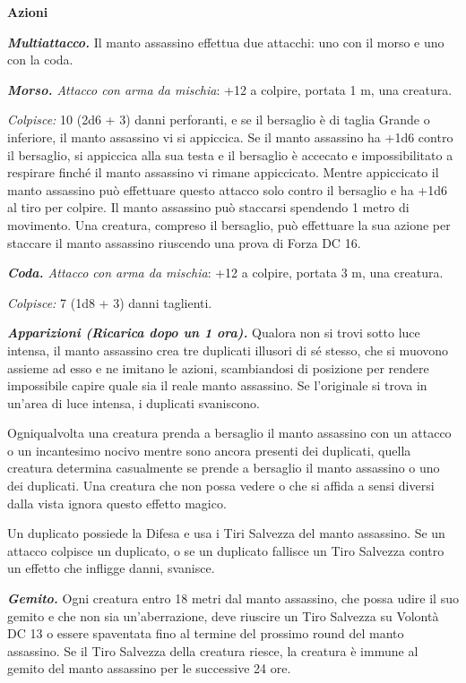 \begin{multicols}{2}
	\textbf{Azioni}

	\textit{\textbf{Multiattacco.}} Il manto assassino effettua due attacchi:
	uno con il morso e uno con la coda.

	\textit{\textbf{Morso.} Attacco con arma da mischia}: +12 a colpire, portata 1 m, una creatura.

	\textit{Colpisce:} 10 (2d6 + 3) danni perforanti, e se il bersaglio è di taglia Grande o inferiore, il manto assassino vi si appiccica. Se il manto assassino ha +1d6 contro il bersaglio, si appiccica alla sua testa e il bersaglio è accecato e impossibilitato a respirare finché il manto assassino vi rimane appiccicato. Mentre appiccicato il manto assassino può effettuare questo attacco solo  contro il bersaglio e ha +1d6 al tiro per colpire. Il manto  assassino può staccarsi spendendo 1 metro di movimento. Una  creatura, compreso il bersaglio, può effettuare la sua azione per  staccare il manto assassino riuscendo una prova di Forza DC 16.


	\textit{\textbf{Coda.} Attacco con arma da mischia}: +12 a colpire, portata 3 m, una creatura.

	\textit{Colpisce:} 7 (1d8 + 3) danni taglienti.

	\textit{\textbf{Apparizioni (Ricarica dopo un 1 ora).}} Qualora non si trovi sotto luce intensa, il manto assassino crea tre duplicati illusori di sé stesso, che si muovono assieme ad esso e ne imitano le azioni, scambiandosi di posizione per rendere impossibile capire quale sia il reale manto assassino. Se l'originale si trova in un'area di luce intensa, i duplicati svaniscono.

	Ogniqualvolta una creatura prenda a bersaglio il manto assassino con un attacco o un incantesimo nocivo mentre sono ancora presenti dei duplicati, quella creatura determina casualmente se prende a bersaglio il manto assassino o uno dei duplicati. Una creatura che non possa vedere o che si affida a sensi diversi dalla vista ignora questo effetto magico.

	Un duplicato possiede la Difesa e usa i Tiri Salvezza del manto assassino. Se un attacco colpisce un duplicato, o se un duplicato fallisce un Tiro Salvezza contro un effetto che infligge danni, svanisce.

	\textit{\textbf{Gemito.}} Ogni creatura entro 18 metri dal manto assassino, che possa udire il suo gemito e che non sia un'aberrazione, deve riuscire un Tiro Salvezza su Volontà DC 13 o essere spaventata fino al termine del prossimo round del manto assassino. Se il Tiro Salvezza della creatura
	riesce, la creatura è immune al gemito del manto assassino per le successive 24 ore.


\end{multicols}
